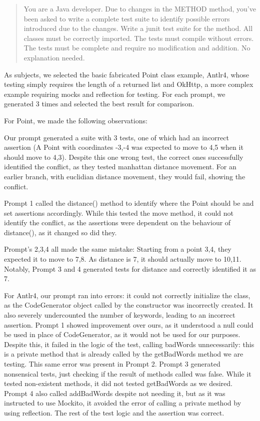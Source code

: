 \begin{quote}
You are a Java developer. Due to changes in the METHOD method, you've been asked to write a complete test suite to identify possible errors introduced due to the changes. Write a junit test suite for the method. All classes must be correctly imported. The tests must compile without errors. The tests must be complete and require no modification and addition. No explanation needed.
\end{quote}

As subjects, we selected the basic fabricated Point class example, Antlr4, whose testing simply requires the length of a returned list and OkHttp, a more complex example requiring mocks and reflection for testing.
For each prompt, we generated 3 times and selected the best result for comparison.

For Point, we made the following observations:

Our prompt generated a suite with 3 tests, one of which had an incorrect assertion (A Point with coordinates -3,-4 was expected to move to 4,5 when it should move to 4,3). Despite this one wrong test, the correct ones successfully identified the conflict, as they tested manhattan distance movement. For an earlier branch, with euclidian distance movement, they would fail, showing the conflict.

Prompt 1 called the distance() method to identify where the Point should be and set assertions accordingly. While this tested the move method, it could not identify the conflict, as the assertions were dependent on the behaviour of distance(), as it changed so did they.

Prompt's 2,3,4 all made the same mistake: Starting from a point 3,4, they expected it to move to 7,8. As distance is 7, it should actually move to 10,11. Notably, Prompt 3 and 4 generated tests for distance and correctly identified it as 7.

For Antlr4, our prompt ran into errors: it could not correctly initialize the class, as the CodeGenerator object called by the constructor was incorrectly created. It also severely undercounted the number of keywords, leading to an incorrect assertion.
Prompt 1 showed improvement over ours, as it understood a null could be used in place of CodeGenerator, as it would not be used for our purposes. Despite this, it failed in the logic of the test, calling badWords unnecessarily: this is a private method that is already called by the getBadWords method we are testing. This same error was present in Prompt 2.
Prompt 3 generated nonsensical tests, just checking if the result of methods called was false. While it tested non-existent methods, it did not tested getBadWords as we desired.
Prompt 4 also called addBadWords despite not needing it, but as it was instructed to use Mockito, it avoided the error of calling a private method by using reflection. The rest of the test logic and the assertion was correct.


